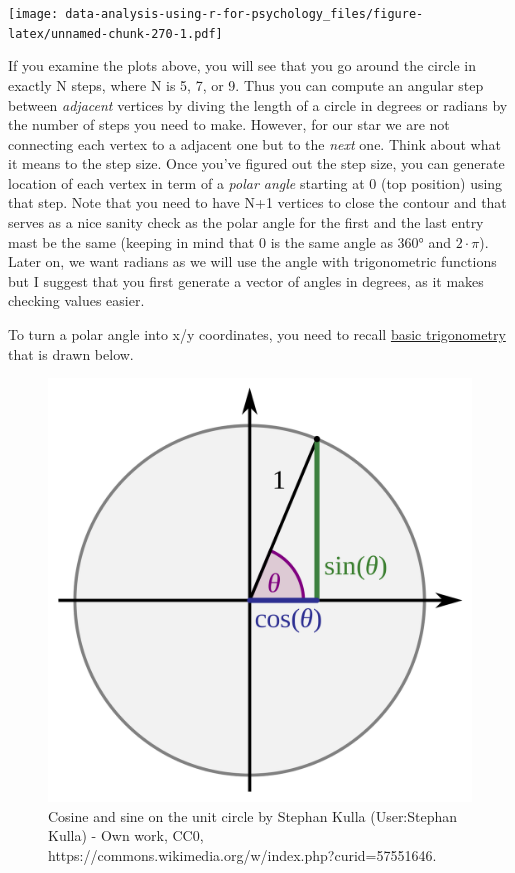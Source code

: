 \documentclass[
]{book}
\begin{document}
\texttt{[image: data-analysis-using-r-for-psychology\_files/figure-latex/unnamed-chunk-270-1.pdf]}

If you examine the plots above, you will see that you go around the circle in exactly N steps, where N is 5, 7, or 9. Thus you can compute an angular step between \emph{adjacent} vertices by diving the length of a circle in degrees or radians by the number of steps you need to make. However, for our star we are not connecting each vertex to a adjacent one but to the \emph{next} one. Think about what it means to the step size. Once you've figured out the step size, you can generate location of each vertex in term of a \emph{polar angle} starting at 0 (top position) using that step. Note that you need to have N+1 vertices to close the contour and that serves as a nice sanity check as the polar angle for the first and the last entry mast be the same (keeping in mind that 0 is the same angle as 360° and \(2\cdot\pi\)). Later on, we want radians as we will use the angle with trigonometric functions but I suggest that you first generate a vector of angles in degrees, as it makes checking values easier.

To turn a polar angle into x/y coordinates, you need to recall \href{https://en.wikipedia.org/wiki/List_of_trigonometric_identities}{basic trigonometry} that is drawn below.

\begin{figure}

{\centering \includegraphics[width=0.5\linewidth]{images/cos_sin_on_unit_circle} 

}

\caption{Cosine and sine on the unit circle by Stephan Kulla (User:Stephan Kulla) - Own work, CC0, https://commons.wikimedia.org/w/index.php?curid=57551646.}\label{fig:unnamed-chunk-271}
\end{figure}
\end{document}

